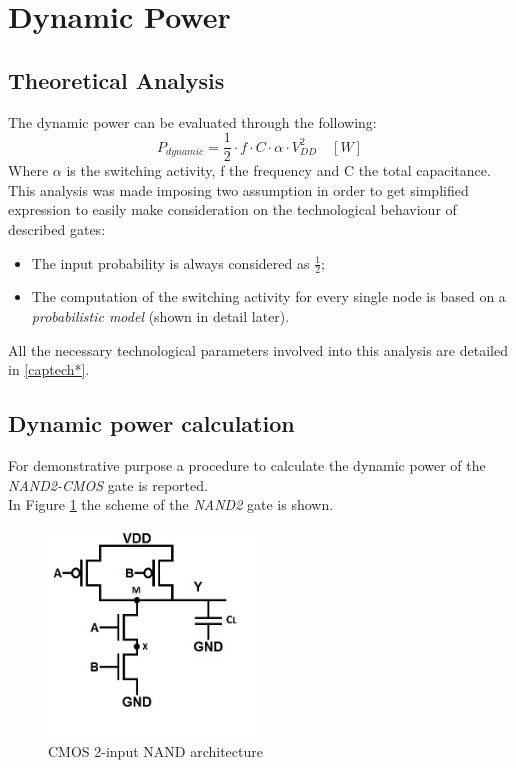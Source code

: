 \documentclass[12pt,  english, makeidx, a4paper, titlepage, oneside]{article}
\begin{document}
\newpage


\section{Dynamic Power}
\subsection{Theoretical Analysis}
The dynamic power can be evaluated through the following:
\begin{equation}
P_{dynamic}=\frac{1}{2} \cdot f \cdot C \cdot \alpha \cdot V_{DD}^{2} \quad [W]
\end{equation}
Where $\alpha$ is the switching activity, f the frequency and C the  total capacitance.\\
This analysis was made imposing two assumption in order to get simplified expression to easily make consideration on the technological behaviour of described gates:
\begin{itemize}
	\item The input probability is always considered as $\frac{1}{2}$;
	\item The computation of the switching activity for every single node is based on a \textit{probabilistic model} (shown in detail later). 
\end{itemize}   
All the necessary technological parameters involved into this analysis are detailed in \ref{captech*}.
\subsection{Dynamic power calculation}
For demonstrative purpose a procedure to calculate the dynamic power of the \textit{NAND2-CMOS} gate is reported.\\
In Figure \ref{NAND2_StaticLogic} the scheme of the \textit{NAND2} gate is shown.
\begin{figure}[htbp]
	\begin{center}
		\includegraphics[width=0.5\textwidth]{img/NAND2_StaticLogic_PotDyn}
		\caption{CMOS 2-input NAND architecture}
		\label{NAND2_StaticLogic}
	\end{center}
\end{figure}
\end{document}
